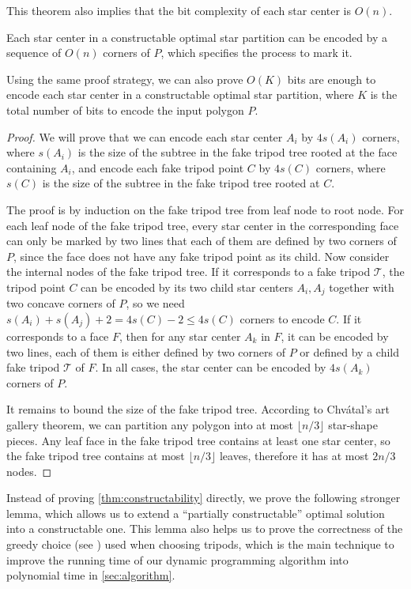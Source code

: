 \documentclass{theoretics}
\begin{document}
This theorem also implies that the bit complexity of each star center is $O(n)$. 
\begin{corollary}
    \label{cor:bit-complexity}
    Each star center in a constructable optimal star partition can be encoded by a sequence of $O(n)$ corners of $P$, which specifies the process to mark it. 
\end{corollary}
\begin{remark}
    Using the same proof strategy, we can also prove $O(K)$ bits are enough to encode each star center in a constructable optimal star partition, where $K$ is the total number of bits to encode the input polygon $P$. 
\end{remark}
\begin{proof}
    We will prove that we can encode each star center $A_i$ by $4s(A_i)$ corners, where $s(A_i)$ is the size of the subtree in the fake tripod tree rooted at the face containing $A_i$, and encode each fake tripod point $C$ by $4s(C)$ corners, where $s(C)$ is the size of the subtree in the fake tripod tree rooted at $C$. 

    The proof is by induction on the fake tripod tree from leaf node to root node. 
    For each leaf node of the fake tripod tree, every star center in the corresponding face can only be marked by two lines that each of them are defined by two corners of $P$, since the face does not have any fake tripod point as its child. 
    Now consider the internal nodes of the fake tripod tree. 
    If it corresponds to a fake tripod $\mathcal{T}$, the tripod point $C$ can be encoded by its two child star centers $A_i, A_j$ together with two concave corners of $P$, so we need $s(A_i) + s(A_j) + 2 = 4s(C) - 2 \leq 4s(C)$ corners to encode $C$. 
    If it corresponds to a face $F$, then for any star center $A_k$ in $F$, it can be encoded by two lines, each of them is either defined by two corners of $P$ or defined by a child fake tripod $\mathcal{T}$ of $F$. 
    In all cases, the star center can be encoded by $4s(A_k)$ corners of $P$. 

    It remains to bound the size of the fake tripod tree. 
    According to Chvátal's art gallery theorem, we can partition any polygon into at most $\lfloor n/3\rfloor$ star-shape pieces. 
    Any leaf face in the fake tripod tree contains at least one star center, so the fake tripod tree contains at most $\lfloor n/3\rfloor$ leaves, therefore it has at most $2n/3$ nodes. 
\end{proof}

Instead of proving \cref{thm:constructability} directly, we prove the following stronger lemma, which allows us to extend a ``partially constructable'' optimal solution into a constructable one. This lemma also helps us to prove the correctness of the greedy choice (see ) used when choosing tripods, which is the main technique to improve the running time of our dynamic programming algorithm into polynomial time in \cref{sec:algorithm}. 
\end{document}
